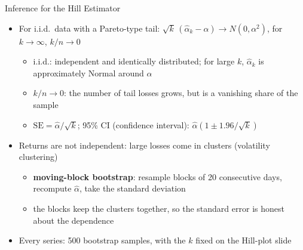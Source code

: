 \begin{frame}{Inference for the Hill Estimator}
\itemsize{\small}
\begin{itemize}
    \item For i.i.d.\ data with a Pareto-type tail: $\sqrt{k}\,(\hat\alpha_k - \alpha) \to N(0, \alpha^2)$, for $k \to \infty$, $k/n \to 0$
    \begin{itemize}
        \item i.i.d.: independent and identically distributed; for large $k$, $\hat\alpha_k$ is approximately Normal around $\alpha$
        \item $k/n \to 0$: the number of tail losses grows, but is a vanishing share of the sample
        \item $\mathrm{SE} = \hat\alpha/\sqrt{k}$; 95\% CI (confidence interval): $\hat\alpha(1 \pm 1.96/\sqrt{k})$
    \end{itemize}
    \item Returns are not independent: large losses come in clusters (volatility clustering)
    \begin{itemize}
        \item \textbf{moving-block bootstrap}: resample blocks of 20 consecutive days, recompute $\hat\alpha$, take the standard deviation
        \item the blocks keep the clusters together, so the standard error is honest about the dependence
    \end{itemize}
    \item Every series: 500 bootstrap samples, with the $k$ fixed on the Hill-plot slide
\end{itemize}
\end{frame}

